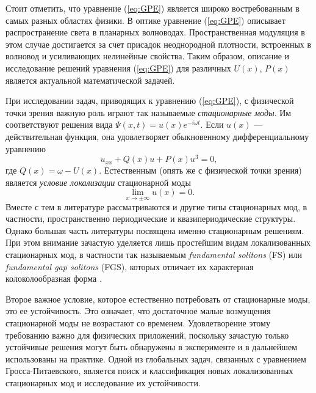Стоит отметить, что уравнение (\ref{eq:GPE}) является широко востребованным в самых разных областях физики.
В оптике уравнение (\ref{eq:GPE}) описывает распространение света в планарных волноводах.
Пространственная модуляция в этом случае достигается за счет присадок неоднородной плотности, встроенных в волновод и усиливающих нелинейные свойства.
Таким образом, описание и исследование решений уравнения (\ref{eq:GPE}) для различных $U(x)$, $P(x)$ является актуальной математической задачей.

При исследовании задач, приводящих к уравнению (\ref{eq:GPE}), с физической точки зрения важную роль играют так называемые {\it стационарные моды}.
Им соответствуют решения вида $\Psi(x, t) = u(x) e^{-i \omega t}$.
Если $u(x)$ --- действительная функция, она удовлетворяет обыкновенному дифференциальному уравнению
%
\begin{equation}
u_{xx} + Q(x)u + P(x)u^3 = 0,
\label{eq:stationary}
\end{equation}
%
где $Q(x) = \omega - U(x)$.
Естественным (опять же с физической точки зрения) является {\it условие локализации} стационарной моды
%
\begin{equation}
\lim \limits_{x \to \pm \infty} u(x) = 0.
\label{eq:localization}
\end{equation}
%
Вместе с тем в литературе рассматриваются и другие типы стационарных мод, в частности, пространственно периодические и квазипериодические структуры.
Однако большая часть литературы посвящена именно стационарным решениям.
При этом внимание зачастую уделяется лишь простейшим видам локализованных стационарных мод, в частности так называемым {\it fundamental solitons} (FS) или {\it fundamental gap solitons} (FGS), которых отличает их характерная колоколообразная форма \cite{Kartashov}.

Второе важное условие, которое естественно потребовать от стационарные моды, это ее устойчивость.
Это означает, что достаточное малые возмущения стационарной моды не возрастают со временем.
Удовлетворение этому требованию важно для физических приложений, поскольку зачастую только устойчивые решения могут быть обнаружены в эксперименте и в дальнейшем использованы на практике.
Одной из глобальных задач, связанных с уравнением Гросса-Питаевского, является поиск и классификация новых локализованных стационарных мод и исследование их устойчивости.

